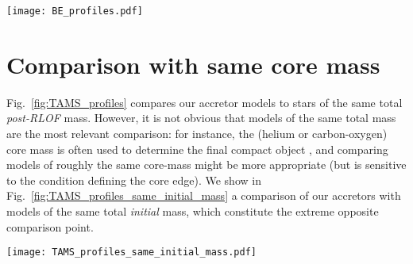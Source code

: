 \documentclass[twocolumn,twocolappendix,trackchanges]{aastex63}
\DeclareRobustCommand{\Figref}[1]{Fig.~\ref{#1}}
\begin{document}
\begin{figure*}[hbtp]
  \texttt{[image: BE\_profiles.pdf]}
  \caption{Binding energy profile at fixed photospheric radius $R$
    (right y-axis) as a function of radius $r(m)$. We only show
    profiles with $\alpha_\mathrm{th}=1$, that is accounting for the
    internal energy content of the star. Orange, red, and other colors
    show respectively the accretor models, single stars of same
    post-RLOF total mass, and engineered models with varying CEB
    steepness. Titles indicates the pre-RLOF and approximate post-RLOF
    accretor masses. The vertical colored lines mark the outer edge of
    the helium cores of the accretor and single star, that is the
    outermost location where $Y>0.1$ and $X<0.01$ (solid lines), or
    $X<0.1$ (dashed), or $X<0.2$ (dot-dashed). The gray dashed lines mark
    the total radius $R$ of these models.}
  \label{fig:BE_profiles}
\end{figure*}


\newpage
\section{Comparison with same core mass}
\label{sec:same_core}

\Figref{fig:TAMS_profiles} compares our accretor models to stars of
the same total \emph{post-RLOF} mass. However, it is not obvious that models
of the same total mass are the most relevant comparison: for instance,
the (helium or carbon-oxygen) core mass is often used to determine the
final compact object \citep[e.g.,][]{fryer:2012, farmer:2019,
  patton:2021, renzo:2022, fryer:2022}, and comparing models of
roughly the same core-mass might be more appropriate (but is sensitive
to the condition defining the core edge). We show in
\Figref{fig:TAMS_profiles_same_initial_mass} a comparison of our
accretors with models of the same total \emph{initial} mass, which
constitute the extreme opposite comparison point.


\begin{figure*}[htbp]
  \centering
  \texttt{[image: TAMS\_profiles\_same\_initial\_mass.pdf]}
  \caption{Specific entropy (top row), H (bottom row, solid lines),
    and He (bottom row, dashed lines) profiles for non-rotating single
    stars (red), accretors (orange), and ``engineered'' models of the
    same total mass as the ZAMS mass of the accretors. The overlapping
    gray bands emphasize the CEB region.}
  \label{fig:TAMS_profiles_same_initial_mass}
\end{figure*}
\end{document}

